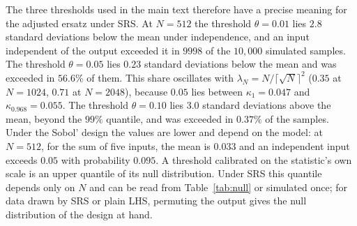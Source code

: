 \documentclass[11pt,a4paper]{article}
\theoremstyle{definition}
\theoremstyle{remark}
\begin{document}
The three thresholds used in the main text therefore have a precise meaning for the adjusted ersatz under SRS. At $N=512$ the threshold $\theta=0.01$ lies $2.8$ standard deviations below the mean under independence, and an input independent of the output exceeded it in $9998$ of the $10{,}000$ simulated samples. The threshold $\theta=0.05$ lies $0.23$ standard deviations below the mean and was exceeded in $56.6\%$ of them. This share oscillates with $\lambda_N=N/\lceil\sqrt N\rceil^2$ ($0.35$ at $N=1024$, $0.71$ at $N=2048$), because $0.05$ lies between $\kappa_1=0.047$ and $\kappa_{0.968}=0.055$. The threshold $\theta=0.10$ lies $3.0$ standard deviations above the mean, beyond the $99\%$ quantile, and was exceeded in $0.37\%$ of the samples. Under the Sobol' design the values are lower and depend on the model: at $N=512$, for the sum of five inputs, the mean is $0.033$ and an independent input exceeds $0.05$ with probability $0.095$. A threshold calibrated on the statistic's own scale is an upper quantile of its null distribution. Under SRS this quantile depends only on $N$ and can be read from Table~\ref{tab:null} or simulated once; for data drawn by SRS or plain LHS, permuting the output gives the null distribution of the design at hand.
\end{document}
